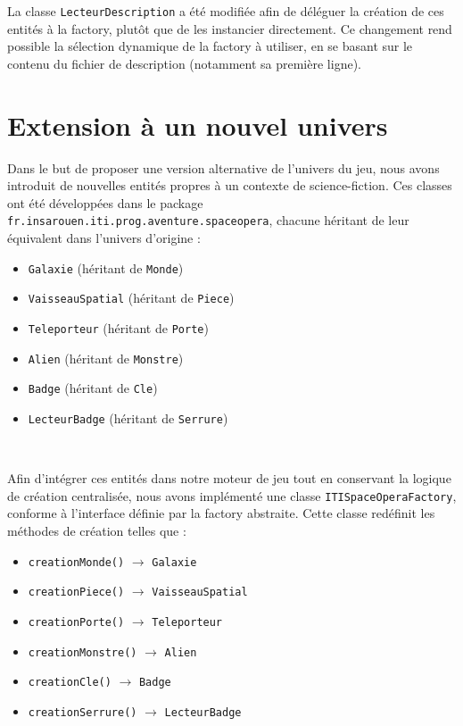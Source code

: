 La classe \texttt{LecteurDescription} a été modifiée afin de déléguer la création de ces entités à la factory, plutôt que de les instancier directement. Ce changement rend possible la sélection dynamique de la factory à utiliser, en se basant sur le contenu du fichier de description (notamment sa première ligne).

\section{Extension à un nouvel univers}

Dans le but de proposer une version alternative de l’univers du jeu, nous avons introduit de nouvelles entités propres à un contexte de science-fiction. Ces classes ont été développées dans le package \texttt{fr.insarouen.iti.prog.aventure.spaceopera}, chacune héritant de leur équivalent dans l’univers d’origine :
\begin{itemize}
  \item \texttt{Galaxie} (héritant de \texttt{Monde})
  \item \texttt{VaisseauSpatial} (héritant de \texttt{Piece})
  \item \texttt{Teleporteur} (héritant de \texttt{Porte})
  \item \texttt{Alien} (héritant de \texttt{Monstre})
  \item \texttt{Badge} (héritant de \texttt{Cle})
  \item \texttt{LecteurBadge} (héritant de \texttt{Serrure})
\end{itemize}\\

\vspace{0.5cm}

Afin d’intégrer ces entités dans notre moteur de jeu tout en conservant la logique de création centralisée, nous avons implémenté une classe \texttt{ITISpaceOperaFactory}, conforme à l’interface définie par la factory abstraite. Cette classe redéfinit les méthodes de création telles que :
\begin{itemize}
  \item \texttt{creationMonde()} $\rightarrow$ \texttt{Galaxie}
  \item \texttt{creationPiece()} $\rightarrow$ \texttt{VaisseauSpatial}
  \item \texttt{creationPorte()} $\rightarrow$ \texttt{Teleporteur}
  \item \texttt{creationMonstre()} $\rightarrow$ \texttt{Alien}
  \item \texttt{creationCle()} $\rightarrow$ \texttt{Badge}
  \item \texttt{creationSerrure()} $\rightarrow$ \texttt{LecteurBadge}
\end{itemize}\\


